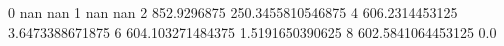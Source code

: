 0 nan nan
1 nan nan
2 852.9296875 250.3455810546875
4 606.2314453125 3.6473388671875
6 604.103271484375 1.5191650390625
8 602.5841064453125 0.0
